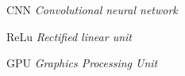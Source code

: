 
\begin{siglas}
    \item[CNN] \textit{Convolutional neural network}
    \item[ReLu] \textit{Rectified linear unit}
    \item[GPU] \textit{Graphics Processing Unit}
\end{siglas}

